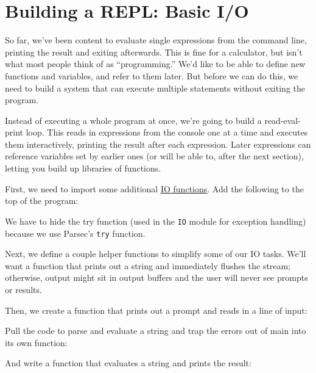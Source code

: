 \chapter[Building a REPL]{Building a REPL: Basic I/O}
 
 
So far, we've been content to evaluate single expressions from the command line, printing the result and exiting afterwards. This is fine for a calculator, but isn't what most people think of as ``programming.'' We'd like to be able to define new functions and variables, and refer to them later. But before we can do this, we need to build a system that can execute multiple statements without exiting the program.
 
Instead of executing a whole program at once, we're going to build a read-eval-print loop. This reads in expressions from the console one at a time and executes them interactively, printing the result after each expression. Later expressions can reference variables set by earlier ones (or will be able to, after the next section), letting you build up libraries of functions.
 
First, we need to import some additional \href{http://www.haskell.org/onlinereport/io.html}{IO functions}. Add the following to the top of the program:
 
 
We have to hide the try function (used in the \verb|IO| module for exception handling) because we use Parsec's \verb|try| function.
 
Next, we define a couple helper functions to simplify some of our IO tasks. We'll want a function that prints out a string and immediately flushes the stream; otherwise, output might sit in output buffers and the user will never see prompts or results.
 
 
Then, we create a function that prints out a prompt and reads in a line of input:
 
 
Pull the code to parse and evaluate a string and trap the errors out of main into its own function:
 
 
And write a function that evaluates a string and prints the result:
 
 
